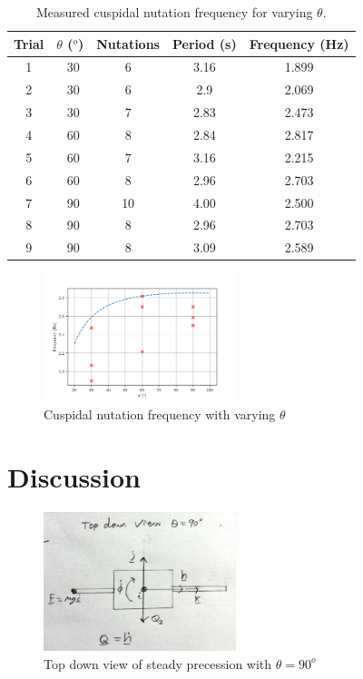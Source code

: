 \documentclass[8pt]{article}
\begin{document}

\begin{table}[H]
    \centering
    \begin{tabular}{|c|c|c|c|c|}
        \hline
        Trial & $\theta$ ($^o$) & Nutations  & Period (s) & Frequency (Hz)\\
        \hline
        1   & ~30	& 6	    &   3.16	& 1.899 \\
        2   & ~30    & 6	    &   2.9	    & 2.069 \\
        3   & ~30    & 7	    &   2.83	& 2.473 \\
        4   & ~60	& 8	    &   2.84	& 2.817 \\
        5   & ~60    & 7	    &   3.16	& 2.215 \\
        6   & ~60    & 8	    &   2.96	& 2.703 \\
        7   & ~90	& 10    &   4.00	& 2.500 \\
        8   & ~90    & 8	    &   2.96	& 2.703 \\
        9   & ~90    & 8	    &   3.09	& 2.589 \\
        \hline
    \end{tabular}
    \caption{Measured cuspidal nutation frequency for varying $\theta$.}
    \label{tab:cuspidal_nutation}
\end{table}

\begin{figure}
    \centering
    \includegraphics[width=0.5\textwidth]{cuspidal_nutation.png}
    \caption{Cuspidal nutation frequency with varying $\theta$}
    \label{fig:cuspidal_nutation}
\end{figure}

\section{Discussion}

\begin{figure}[H]
    \centering
    \includegraphics[width=0.5\textwidth]{top_down_precession.jpg}
    \caption{Top down view of steady precession with $\theta = 90^o$}
    \label{fig:precession_vs_mass}
\end{figure}
\end{document}
